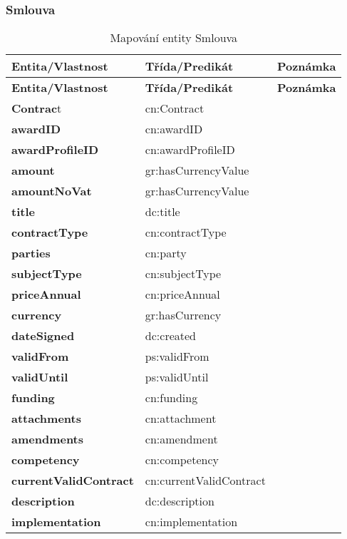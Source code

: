\subsubsection*{Smlouva}

\begin{center}
\begin{longtable}{lll}
\label{grid_mlmmh} \\
\multicolumn{1}{l}{\textbf{Entita/Vlastnost}} & 
\multicolumn{1}{l}{\textbf{Třída/Predikát}} & 
\multicolumn{1}{l}{\textbf{Poznámka}} \\ \hline 
\endfirsthead
\multicolumn{1}{l}{\textbf{Entita/Vlastnost}} & 
\multicolumn{1}{l}{\textbf{Třída/Predikát}} & 
\multicolumn{1}{l}{\textbf{Poznámka}} \\ \hline 
\hline
\endhead
\endfoot
\caption{Mapování entity Smlouva}
\endlastfoot
\textbf{Contrac}t & cn:Contract \\
\textbf{awardID} & cn:awardID \\
\textbf{awardProfileID} & cn:awardProfileID \\
\textbf{amount} & gr:hasCurrencyValue \\
\textbf{amountNoVat} & gr:hasCurrencyValue \\
\textbf{title} & dc:title \\
\textbf{contractType} & cn:contractType \\
\textbf{parties} & cn:party \\
\textbf{subjectType} & cn:subjectType \\
\textbf{priceAnnual} & cn:priceAnnual \\
\textbf{currency} & gr:hasCurrency \\
\textbf{dateSigned} & dc:created \\
\textbf{validFrom} & ps:validFrom \\
\textbf{validUntil} & ps:validUntil \\
\textbf{funding} & cn:funding \\
\textbf{attachments} & cn:attachment \\
\textbf{amendments} & cn:amendment \\
\textbf{competency} & cn:competency \\
\textbf{currentValidContract} & cn:currentValidContract \\
\textbf{description} & dc:description \\
\textbf{implementation} & cn:implementation \\
\end{longtable}
\end{center}

